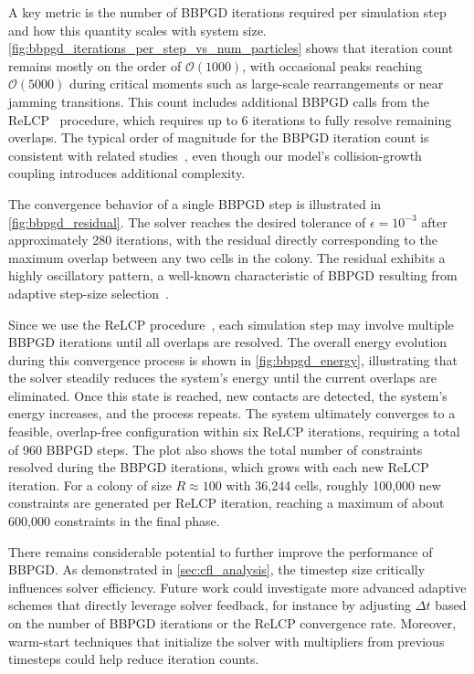 \documentclass[conference]{IEEEtran}
\begin{document}
A key metric is the number of BBPGD iterations required per simulation step and how this quantity scales with system size. \autoref{fig:bbpgd_iterations_per_step_vs_num_particles} shows that iteration count remains mostly on the order of $\mathcal{O}(1000)$, with occasional peaks reaching $\mathcal{O}(5000)$ during critical moments such as large-scale rearrangements or near jamming transitions. This count includes additional BBPGD calls from the ReLCP~\cite{Weady2024SM} procedure, which requires up to 6 iterations to fully resolve remaining overlaps. The typical order of magnitude for the BBPGD iteration count is consistent with related studies~\cite{Yan2019}, even though our model's collision-growth coupling introduces additional complexity.

The convergence behavior of a single BBPGD step is illustrated in \autoref{fig:bbpgd_residual}. The solver reaches the desired tolerance of $\epsilon = 10^{-3}$ after approximately 280 iterations, with the residual directly corresponding to the maximum overlap between any two cells in the colony. The residual exhibits a highly oscillatory pattern, a well-known characteristic of BBPGD resulting from adaptive step-size selection~\cite{BBPGD,Schneider2021}.

Since we use the ReLCP procedure~\cite{Weady2024SM}, each simulation step may involve multiple BBPGD iterations until all overlaps are resolved. The overall energy evolution during this convergence process is shown in \autoref{fig:bbpgd_energy}, illustrating that the solver steadily reduces the system's energy until the current overlaps are eliminated. Once this state is reached, new contacts are detected, the system's energy increases, and the process repeats. The system ultimately converges to a feasible, overlap-free configuration within six ReLCP iterations, requiring a total of 960 BBPGD steps. The plot also shows the total number of constraints resolved during the BBPGD iterations, which grows with each new ReLCP iteration. For a colony of size $R \approx 100$ with 36,244 cells, roughly 100,000 new constraints are generated per ReLCP iteration, reaching a maximum of about 600,000 constraints in the final phase.

There remains considerable potential to further improve the performance of BBPGD. As demonstrated in \autoref{sec:cfl_analysis}, the timestep size critically influences solver efficiency. Future work could investigate more advanced adaptive schemes that directly leverage solver feedback, for instance by adjusting $\Delta t$ based on the number of BBPGD iterations or the ReLCP convergence rate. Moreover, warm-start techniques that initialize the solver with multipliers from previous timesteps could help reduce iteration counts.
\end{document}
